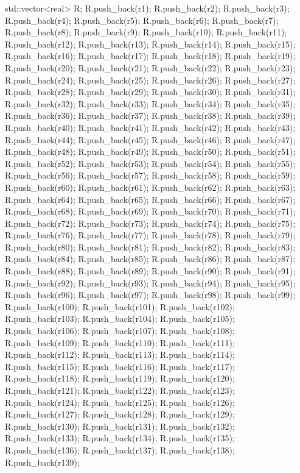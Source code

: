 \begin{DoxyCode}
{
    std::vector<real> R;
R.push_back(r1);
R.push_back(r2);
R.push_back(r3);
R.push_back(r4);
R.push_back(r5);
R.push_back(r6);
R.push_back(r7);
R.push_back(r8);
R.push_back(r9);
R.push_back(r10);
R.push_back(r11);
R.push_back(r12);
R.push_back(r13);
R.push_back(r14);
R.push_back(r15);
R.push_back(r16);
R.push_back(r17);
R.push_back(r18);
R.push_back(r19);
R.push_back(r20);
R.push_back(r21);
R.push_back(r22);
R.push_back(r23);
R.push_back(r24);
R.push_back(r25);
R.push_back(r26);
R.push_back(r27);
R.push_back(r28);
R.push_back(r29);
R.push_back(r30);
R.push_back(r31);
R.push_back(r32);
R.push_back(r33);
R.push_back(r34);
R.push_back(r35);
R.push_back(r36);
R.push_back(r37);
R.push_back(r38);
R.push_back(r39);
R.push_back(r40);
R.push_back(r41);
R.push_back(r42);
R.push_back(r43);
R.push_back(r44);
R.push_back(r45);
R.push_back(r46);
R.push_back(r47);
R.push_back(r48);
R.push_back(r49);
R.push_back(r50);
R.push_back(r51);
R.push_back(r52);
R.push_back(r53);
R.push_back(r54);
R.push_back(r55);
R.push_back(r56);
R.push_back(r57);
R.push_back(r58);
R.push_back(r59);
R.push_back(r60);
R.push_back(r61);
R.push_back(r62);
R.push_back(r63);
R.push_back(r64);
R.push_back(r65);
R.push_back(r66);
R.push_back(r67);
R.push_back(r68);
R.push_back(r69);
R.push_back(r70);
R.push_back(r71);
R.push_back(r72);
R.push_back(r73);
R.push_back(r74);
R.push_back(r75);
R.push_back(r76);
R.push_back(r77);
R.push_back(r78);
R.push_back(r79);
R.push_back(r80);
R.push_back(r81);
R.push_back(r82);
R.push_back(r83);
R.push_back(r84);
R.push_back(r85);
R.push_back(r86);
R.push_back(r87);
R.push_back(r88);
R.push_back(r89);
R.push_back(r90);
R.push_back(r91);
R.push_back(r92);
R.push_back(r93);
R.push_back(r94);
R.push_back(r95);
R.push_back(r96);
R.push_back(r97);
R.push_back(r98);
R.push_back(r99);
R.push_back(r100);
R.push_back(r101);
R.push_back(r102);
R.push_back(r103);
R.push_back(r104);
R.push_back(r105);
R.push_back(r106);
R.push_back(r107);
R.push_back(r108);
R.push_back(r109);
R.push_back(r110);
R.push_back(r111);
R.push_back(r112);
R.push_back(r113);
R.push_back(r114);
R.push_back(r115);
R.push_back(r116);
R.push_back(r117);
R.push_back(r118);
R.push_back(r119);
R.push_back(r120);
R.push_back(r121);
R.push_back(r122);
R.push_back(r123);
R.push_back(r124);
R.push_back(r125);
R.push_back(r126);
R.push_back(r127);
R.push_back(r128);
R.push_back(r129);
R.push_back(r130);
R.push_back(r131);
R.push_back(r132);
R.push_back(r133);
R.push_back(r134);
R.push_back(r135);
R.push_back(r136);
R.push_back(r137);
R.push_back(r138);
R.push_back(r139);
}
\end{DoxyCode}
